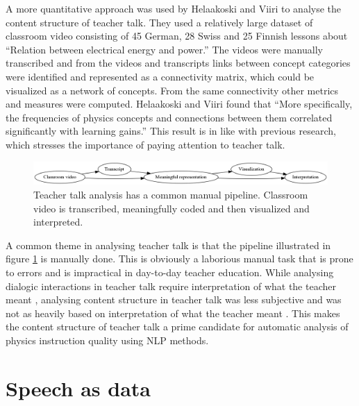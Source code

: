 \documentclass[utf8,english]{gradu3}
\begin{document}
A more quantitative approach was used by Helaakoski and Viiri \parencite{helaakoskiContentContentStructure2014} to analyse the content structure of teacher talk. They used a relatively large dataset of classroom video consisting of 45 German, 28 Swiss and 25 Finnish lessons about \enquote{Relation  between  electrical  energy  and  power.} The videos were manually transcribed and from the videos and transcripts links between concept categories were identified and represented as a connectivity matrix, which could be visualized as a network of concepts. From the same connectivity other metrics and measures were computed. Helaakoski and Viiri \parencite*{helaakoskiContentContentStructure2014} found that \enquote{More  specifically,  the  frequencies  of  physics  concepts  and  connections  between  them  correlated  significantly  with  learning  gains.} This result is in like with previous research, which stresses the importance of paying attention to teacher talk. \parencite{viiriTeacherTalkPatterns2006 ,scottTeachingScienceMeaningful2007,scottPedagogicalLinkMaking2011}

\begin{figure}
  \includegraphics[width=\linewidth]{../figures/teacher_talk_manual_pipeline.png}
  \caption{Teacher talk analysis has a common manual pipeline. Classroom video is transcribed, meaningfully coded and then visualized and interpreted.}
  \label{fig:manualpipeline}
\end{figure}

A common theme in analysing teacher talk is that the pipeline illustrated in figure \ref{fig:manualpipeline} is manually done.  This is obviously a laborious manual task that is prone to errors and is impractical in day-to-day teacher education. While analysing dialogic interactions in teacher talk require interpretation of what the teacher meant \parencite{viiriTeacherTalkPatterns2006}, analysing content structure in teacher talk was less subjective and was not as heavily based on interpretation of what the teacher meant \parencite{helaakoskiContentContentStructure2014}. This makes the content structure of teacher talk a prime candidate for automatic analysis of physics instruction quality using NLP methods. 

\chapter{Speech as data}
\label{chap:speech}
\end{document}

